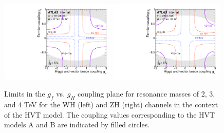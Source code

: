 \begin{figure}[htbp!]
    \begin{center}
        \includegraphics[width=0.49\textwidth]{HVT_coupling_WH.pdf}
        \includegraphics[width=0.49\textwidth]{HVT_coupling_ZH.pdf}
    \end{center}
    \caption{
        Limits in the $g_f$ vs. $g_H$ coupling plane for resonance masses of 2, 3, and 4 TeV for the WH (left) and ZH (right) channels in the context of the HVT model.
        The coupling values corresponding to the HVT models A and B are indicated by filled circles.
    }
    \label{fig:hvt_coupling_plane}
\end{figure}

